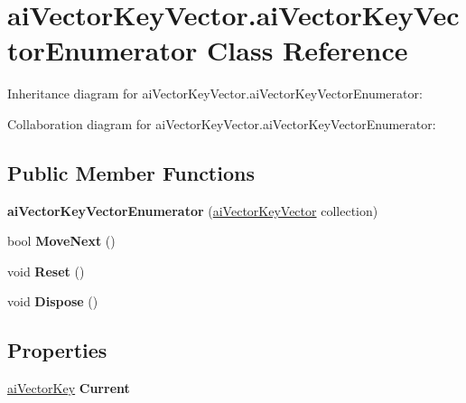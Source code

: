 \hypertarget{classai_vector_key_vector_1_1ai_vector_key_vector_enumerator}{\section{ai\+Vector\+Key\+Vector.\+ai\+Vector\+Key\+Vector\+Enumerator Class Reference}
\label{classai_vector_key_vector_1_1ai_vector_key_vector_enumerator}
}


Inheritance diagram for ai\+Vector\+Key\+Vector.\+ai\+Vector\+Key\+Vector\+Enumerator\+:


Collaboration diagram for ai\+Vector\+Key\+Vector.\+ai\+Vector\+Key\+Vector\+Enumerator\+:
\subsection*{Public Member Functions}
\begin{DoxyCompactItemize}
\item 
\hypertarget{classai_vector_key_vector_1_1ai_vector_key_vector_enumerator_a73f20cd5d3f53d3b432e0e910b1e34f0}{{\bfseries ai\+Vector\+Key\+Vector\+Enumerator} (\hyperlink{classai_vector_key_vector}{ai\+Vector\+Key\+Vector} collection)}\label{classai_vector_key_vector_1_1ai_vector_key_vector_enumerator_a73f20cd5d3f53d3b432e0e910b1e34f0}

\item 
\hypertarget{classai_vector_key_vector_1_1ai_vector_key_vector_enumerator_a31bfce439d5906fb5bc1c8f67de0ae2c}{bool {\bfseries Move\+Next} ()}\label{classai_vector_key_vector_1_1ai_vector_key_vector_enumerator_a31bfce439d5906fb5bc1c8f67de0ae2c}

\item 
\hypertarget{classai_vector_key_vector_1_1ai_vector_key_vector_enumerator_a3f1da7650b89e90fe63a278c60cf19b0}{void {\bfseries Reset} ()}\label{classai_vector_key_vector_1_1ai_vector_key_vector_enumerator_a3f1da7650b89e90fe63a278c60cf19b0}

\item 
\hypertarget{classai_vector_key_vector_1_1ai_vector_key_vector_enumerator_a3428560f49208606de59880a458377f2}{void {\bfseries Dispose} ()}\label{classai_vector_key_vector_1_1ai_vector_key_vector_enumerator_a3428560f49208606de59880a458377f2}

\end{DoxyCompactItemize}
\subsection*{Properties}
\begin{DoxyCompactItemize}
\item 
\hypertarget{classai_vector_key_vector_1_1ai_vector_key_vector_enumerator_ab0d2b0fe790b26e7bdcb458e1661aa80}{\hyperlink{structai_vector_key}{ai\+Vector\+Key} {\bfseries Current}}\label{classai_vector_key_vector_1_1ai_vector_key_vector_enumerator_ab0d2b0fe790b26e7bdcb458e1661aa80}

\end{DoxyCompactItemize}


